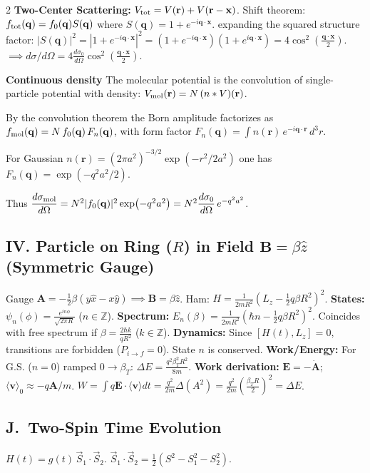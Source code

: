 \documentclass[9pt,a4paper]{article} %
\begin{document}
\begin{multicols}{2}
\textbf{Two-Center Scattering:}
$V_{\rm tot} = V(\mathbf{r}) + V(\mathbf{r}-\mathbf{x})$.
Shift theorem: $f_{\rm tot}(\mathbf{q}) = f_0(\mathbf{q})S(\mathbf{q})$ where $S(\mathbf{q}) = 1 + e^{-i\mathbf{q}\cdot\mathbf{x}}$.
 expanding the squared structure factor:
$|S(\mathbf{q})|^2 = |1 + e^{-i\mathbf{q}\cdot\mathbf{x}}|^2 = (1+e^{-i\mathbf{q}\cdot\mathbf{x}})(1+e^{i\mathbf{q}\cdot\mathbf{x}}) = 4\cos^2\left(\frac{\mathbf{q}\cdot\mathbf{x}}{2}\right)$.
$\implies d\sigma/d\Omega = 4\frac{d\sigma_0}{d\Omega}\cos^2(\frac{\mathbf{q}\cdot\mathbf{x}}{2})$.

\textbf{Continuous density}  
The molecular potential is the convolution of single-particle potential with density:  
$V_{\rm mol}(\mathbf{r}) = N\,(n * V)(\mathbf{r})$.

By the convolution theorem the Born amplitude factorizes as  
$f_{\rm mol}(\mathbf{q}) = N\, f_0(\mathbf{q})\, F_n(\mathbf{q})$,  
with form factor $F_n(\mathbf{q}) = \int n(\mathbf{r})\,e^{-i\mathbf{q}\cdot\mathbf{r}}\,d^3r$.

For Gaussian $n(\mathbf{r}) = (2\pi a^2)^{-3/2}\exp(-r^2/2a^2)$ one has  
$F_n(\mathbf{q}) = \exp(-q^2 a^2/2)$.

Thus  
$\dfrac{d\sigma_{\rm mol}}{d\Omega} = N^2 |f_0(\mathbf{q})|^2 \exp(-q^2 a^2) = N^2 \dfrac{d\sigma_0}{d\Omega}\, e^{-q^2 a^2}$.
\subsection{IV. Particle on Ring ($R$) in Field $\mathbf{B}=\beta\hat{z}$ (Symmetric Gauge)}
Gauge $\mathbf{A} = -\frac{1}{2}\beta(y\hat{x}-x\hat{y}) \implies \mathbf{B}=\beta\hat{z}$. Ham: $H=\frac{1}{2mR^2}\left(L_z - \frac{1}{2}q\beta R^2\right)^2$.
\textbf{States:} $\psi_n(\phi) = \frac{e^{in\phi}}{\sqrt{2\pi R}}$ ($n\in\mathbb{Z}$).
\textbf{Spectrum:} $E_n(\beta) = \frac{1}{2mR^2}(\hbar n - \frac{1}{2}q\beta R^2)^2$. Coincides with free spectrum if $\beta = \frac{2\hbar k}{q R^2}$ ($k\in\mathbb{Z}$).
\textbf{Dynamics:} Since $[H(t), L_z]=0$, transitions are forbidden ($P_{i\to f}=0$). State $n$ is conserved.
\textbf{Work/Energy:} For G.S. ($n=0$) ramped $0\to\beta_T$: $\Delta E = \frac{q^2\beta_T^2 R^2}{8m}$.
\textbf{Work derivation:} $\mathbf{E} = -\dot{\mathbf{A}}$; $\langle\mathbf{v}\rangle_{0} \approx -q\mathbf{A}/m$. $W = \int q\mathbf{E}\cdot\langle\mathbf{v}\rangle dt = \frac{q^2}{2m}\Delta(A^2) = \frac{q^2}{2m}(\frac{\beta_T R}{2})^2 = \Delta E$.
\subsection{J.\ Two-Spin Time Evolution}
$H(t)=g(t)\,\vec{S}_1\cdot\vec{S}_2$.\;
$\vec{S}_1\cdot\vec{S}_2=\frac{1}{2}(S^2-S_1^2-S_2^2)$.


\end{multicols}
\end{document}
